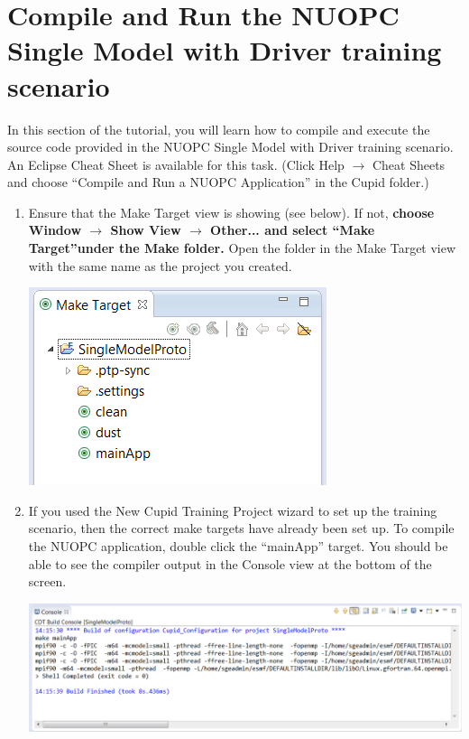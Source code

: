 \documentclass[oneside,11pt]{memoir}
\begin{document}
\begin{enumerate}
\end{enumerate}



\section{Compile and Run the NUOPC Single Model with Driver training scenario}

In this section of the tutorial, you will learn how to compile and execute the source code provided in the NUOPC Single Model with Driver training scenario.   An Eclipse Cheat Sheet is available for this task.  (Click Help $\rightarrow$ Cheat Sheets and choose ``Compile and Run a NUOPC Application'' in the Cupid folder.)

\begin{enumerate}

\item Ensure that the Make Target view is showing (see below).  If not, \textbf{choose Window $\rightarrow$ Show View $\rightarrow$ Other... and select ``Make Target''under the Make folder.}  Open the folder in the Make Target view with the same name as the project you created.

\parbox{\linewidth}{\centering
  \includegraphics{figs/cloudrun_fig1.png}
}

\item If you used the New Cupid Training Project wizard to set up the training scenario, then the correct make targets have already been set up.  To compile the NUOPC application, double click the ``mainApp'' target.  You should be able to see the compiler output in the Console view at the bottom of the screen.

\parbox{\linewidth}{\centering
  \includegraphics[width=\textwidth]{figs/cloudrun_fig2.png}
}


\end{enumerate}
\end{document}
